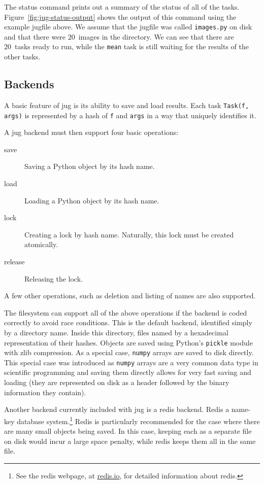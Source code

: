 \documentclass{article}
\let\code\texttt
\begin{document}
The status command prints out a summary of the status of all of the tasks.
Figure~\ref{fig:jug-status-output} shows the output of this command using the
example jugfile above. We assume that the jugfile was called \code{images.py}
on disk and that there were 20~images in the directory. We can see that there
are 20~tasks ready to run, while the \code{mean} task is still waiting for the
results of the other tasks.

\subsection{Backends}

A basic feature of jug is its ability to save and load results. Each task
\code{Task(f, args)} is represented by a hash of \code{f} and \code{args} in a
way that uniquely identifies it.

A jug backend must then support four basic operations:

\begin{description}
\item[save] Saving a Python object by its hash name.
\item[load] Loading a Python object by its hash name.
\item[lock] Creating a lock by hash name. Naturally, this lock must be created
atomically.
\item[release] Releasing the lock.
\end{description}

A few other operations, such as deletion and listing of names are also
supported.

The filesystem can support all of the above operations if the backend is coded
correctly to avoid race conditions. This is the default backend, identified
simply by a directory name. Inside this directory, files named by a hexadecimal
representation of their hashes. Objects are saved using Python's \code{pickle}
module with zlib compression. As a special case, \code{numpy} arrays
\citep{numpy} are saved to disk directly. This special case was introduced as
\code{numpy} arrays are a very common data type in scientific programming and
saving them directly allows for very fast saving and loading (they are
represented on disk as a header followed by the binary information they
contain).

Another backend currently included with jug is a redis backend. Redis a
name-key database system.\footnote{See the redis webpage, at
\href{http://redis.io}{redis.io}, for detailed information about redis.} Redis
is particularly recommended for the case where there are many small objects
being saved. In this case, keeping each as a separate file on disk would incur
a large space penalty, while redis keeps them all in the same file.
\end{document}
